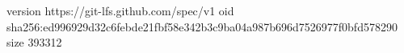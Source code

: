 version https://git-lfs.github.com/spec/v1
oid sha256:ed996929d32c6febde21fbf58e342b3c9ba04a987b696d7526977f0bfd578290
size 393312
